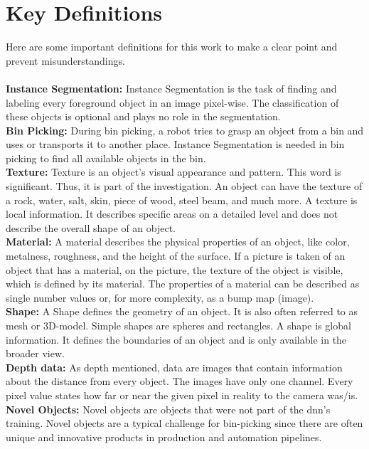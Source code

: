 	\section{Key Definitions}
	\label{sec:key-definitions}
		Here are some important definitions for this work to make a clear point and prevent misunderstandings.\\
		\\
		\textbf{Instance Segmentation:} Instance Segmentation is the task of finding and labeling every foreground object in an image pixel-wise. The classification of these objects is optional and plays no role in the segmentation.\\
		\textbf{Bin Picking:} During bin picking, a robot tries to grasp an object from a bin and uses or transports it to another place. Instance Segmentation is needed in bin picking to find all available objects in the bin.\\
		\textbf{Texture:} Texture is an object's visual appearance and pattern. This word is significant. Thus, it is part of the investigation. An object can have the texture of a rock, water, salt, skin, piece of wood, steel beam, and much more. A texture is local information. It describes specific areas on a detailed level and does not describe the overall shape of an object.\\
		\textbf{Material:} A material describes the physical properties of an object, like color, metalness, roughness, and the height of the surface. If a picture is taken of an object that has a material, on the picture, the texture of the object is visible, which is defined by its material. The properties of a material can be described as single number values or, for more complexity, as a bump map (image).\\
		\textbf{Shape:} A Shape defines the geometry of an object. It is also often referred to as mesh or 3D-model. Simple shapes are spheres and rectangles. A shape is global information. It defines the boundaries of an object and is only available in the broader view.\\
		\textbf{Depth data:} As depth mentioned, data are images that contain information about the distance from every object. The images have only one channel. Every pixel value states how far or near the given pixel in reality to the camera was/is.\\
		\textbf{Novel Objects:} Novel objects are objects that were not part of the \ac{dnn}'s training. Novel objects are a typical challenge for bin-picking since there are often unique and innovative products in production and automation pipelines.\\
